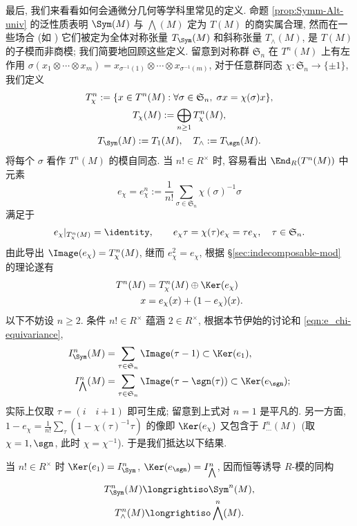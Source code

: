 最后, 我们来看看如何会通微分几何等学科里常见的定义. 命题 \ref{prop:Symm-Alt-univ} 的泛性质表明 $\Sym(M)$ 与 $\bigwedge(M)$ 定为 $T(M)$ 的商实属合理, 然而在一些场合 (如 \cite[\S 2.2]{ChCh}) 它们被定为全体对称张量 $T_{\Sym}(M)$ 和斜称张量 $T_\wedge(M)$, 是 $T(M)$ 的子模而非商模; 我们简要地回顾这些定义. 留意到对称群 $\mathfrak{S}_n$ 在 $T^n(M)$ 上有左作用 $\sigma(x_1 \otimes \cdots \otimes x_m) = x_{\sigma^{-1}(1)} \otimes \cdots \otimes x_{\sigma^{-1}(m)}$, 对于任意群同态 $\chi: \mathfrak{S}_n \to \{\pm 1\}$, 我们定义
\begin{gather*}
	T^n_\chi := \{x \in T^n(M): \forall \sigma \in \mathfrak{S}_n,\; \sigma x = \chi(\sigma)x\}, \\
	T_\chi(M) := \bigoplus_{n \geq 1} T^n_\chi(M), \\
	T_{\Sym}(M) := T_1(M), \quad T_\wedge := T_{\sgn}(M).
\end{gather*}
将每个 $\sigma$ 看作 $T^n(M)$ 的模自同态. 当 $n! \in R^\times$ 时, 容易看出 $\End_R(T^n(M))$ 中元素
\[ e_\chi = e^n_\chi := \frac{1}{n!} \sum_{\sigma \in \mathfrak{S}_n} \chi(\sigma)^{-1} \sigma \]
满足于
\begin{gather}\label{eqn:e_chi-equivariance}
	e_\chi|_{T^n_\chi(M)} = \identity, \qquad e_\chi \tau = \chi(\tau) e_\chi = \tau e_\chi, \quad \tau \in \mathfrak{S}_n.
\end{gather}
由此导出 $\Image(e_\chi) = T^n_\chi(M)$, 继而 $e_\chi^2 = e_\chi$, 根据 \S\ref{sec:indecomposable-mod} 的理论遂有
\begin{align*}
	T^n(M) & = T^n_\chi(M) \oplus \Ker(e_\chi) \\
	x & = e_\chi(x) + (1 - e_\chi)(x).
\end{align*}
以下不妨设 $n \geq 2$. 条件 $n! \in R^\times$ 蕴涵 $2 \in R^\times$, 根据本节伊始的讨论和 \eqref{eqn:e_chi-equivariance},
\begin{align*}
	I^n_{\Sym}(M) & = \sum_{\tau \in \mathfrak{S}_n} \Image(\tau - 1) \subset \Ker(e_1), \\
	I^n_{\bigwedge}(M) & = \sum_{\tau \in \mathfrak{S}_n} \Image(\tau - \sgn(\tau)) \subset \Ker(e_{\sgn});
\end{align*}
实际上仅取 $\tau= (i \quad i+1)$ 即可生成; 留意到上式对 $n=1$ 是平凡的. 另一方面, $1 - e_\chi = \frac{1}{n!} \sum_\tau (1 - \chi(\tau)^{-1} \tau)$ 的像即 $\Ker(e_\chi)$ 又包含于 $I^n_{\cdots}(M)$ (取 $\chi = 1, \sgn$, 此时 $\chi=\chi^{-1}$). 于是我们抵达以下结果.
\begin{theorem}
	当 $n! \in R^\times$ 时 $\Ker(e_1) = I^n_{\Sym}$, $\Ker(e_{\sgn}) = I^n_{\bigwedge}$, 因而恒等诱导 $R$-模的同构
	\begin{gather*}
		T^n_{\Sym}(M) \longrightiso \Sym^n(M), \\
		T^n_\wedge(M) \longrightiso \bigwedge^n(M).
	\end{gather*}
\end{theorem}

